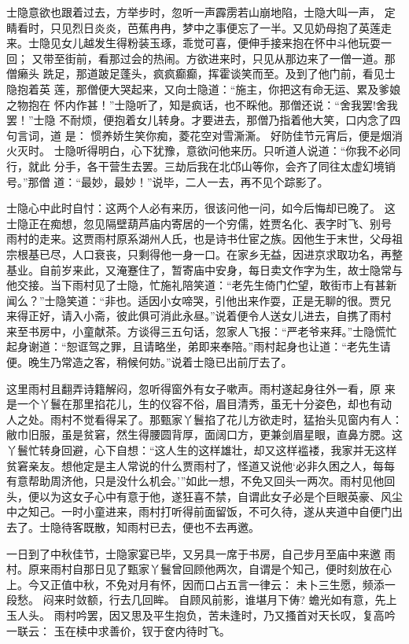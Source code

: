 士隐意欲也跟着过去，方举步时，忽听一声霹雳若山崩地陷，士隐大叫一声，
定睛看时，只见烈日炎炎，芭蕉冉冉，梦中之事便忘了一半。又见奶母抱了英莲走
来。士隐见女儿越发生得粉装玉琢，乖觉可喜，便伸手接来抱在怀中斗他玩耍一回；
又带至街前，看那过会的热闹。方欲进来时，只见从那边来了一僧一道。那僧癞头
跣足，那道跛足蓬头，疯疯癫癫，挥霍谈笑而至。及到了他门前，看见士隐抱着英
莲，那僧便大哭起来，又向士隐道：“施主，你把这有命无运、累及爹娘之物抱在
怀内作甚！”士隐听了，知是疯话，也不睬他。那僧还说：“舍我罢!舍我罢！”士隐
不耐烦，便抱着女儿转身。才要进去，那僧乃指着他大笑，口内念了四句言词，道
是：
惯养娇生笑你痴，菱花空对雪澌澌。
好防佳节元宵后，便是烟消火灭时。
士隐听得明白，心下犹豫，意欲问他来历。只听道人说道：“你我不必同行，就此
分手，各干营生去罢。三劫后我在北邙山等你，会齐了同往太虚幻境销号。”那僧
道：“最妙，最妙！”说毕，二人一去，再不见个踪影了。

士隐心中此时自忖：这两个人必有来历，很该问他一问，如今后悔却已晚了。
这士隐正在痴想，忽见隔壁葫芦庙内寄居的一个穷儒，姓贾名化、表字时飞、别号
雨村的走来。这贾雨村原系湖州人氏，也是诗书仕宦之族。因他生于末世，父母祖
宗根基已尽，人口衰丧，只剩得他一身一口。在家乡无益，因进京求取功名，再整
基业。自前岁来此，又淹蹇住了，暂寄庙中安身，每日卖文作字为生，故士隐常与
他交接。当下雨村见了士隐，忙施礼陪笑道：“老先生倚门伫望，敢街市上有甚新
闻么？”士隐笑道：“非也。适因小女啼哭，引他出来作耍，正是无聊的很。贾兄
来得正好，请入小斋，彼此俱可消此永昼。”说着便令人送女儿进去，自携了雨村
来至书房中，小童献茶。方谈得三五句话，忽家人飞报：“严老爷来拜。”士隐慌忙
起身谢道：“恕诓驾之罪，且请略坐，弟即来奉陪。”雨村起身也让道：“老先生请
便。晚生乃常造之客，稍候何妨。”说着士隐已出前厅去了。

这里雨村且翻弄诗籍解闷，忽听得窗外有女子嗽声。雨村遂起身往外一看，原
来是一个丫鬟在那里掐花儿，生的仪容不俗，眉目清秀，虽无十分姿色，却也有动
人之处。雨村不觉看得呆了。那甄家丫鬟掐了花儿方欲走时，猛抬头见窗内有人：
敝巾旧服，虽是贫窘，然生得腰圆背厚，面阔口方，更兼剑眉星眼，直鼻方腮。这
丫鬟忙转身回避，心下自想：“这人生的这样雄壮，却又这样褴褛，我家并无这样
贫窘亲友。想他定是主人常说的什么贾雨村了，怪道又说他‘必非久困之人，每每
有意帮助周济他，只是没什么机会。’”如此一想，不免又回头一两次。雨村见他回
头，便以为这女子心中有意于他，遂狂喜不禁，自谓此女子必是个巨眼英豪、风尘
中之知己。一时小童进来，雨村打听得前面留饭，不可久待，遂从夹道中自便门出
去了。士隐待客既散，知雨村已去，便也不去再邀。

一日到了中秋佳节，士隐家宴已毕，又另具一席于书房，自己步月至庙中来邀
雨村。原来雨村自那日见了甄家丫鬟曾回顾他两次，自谓是个知己，便时刻放在心
上。今又正值中秋，不免对月有怀，因而口占五言一律云：
未卜三生愿，频添一段愁。
闷来时敛额，行去几回眸。
自顾风前影，谁堪月下俦?
蟾光如有意，先上玉人头。
雨村吟罢，因又思及平生抱负，苦未逢时，乃又搔首对天长叹，复高吟一联云：
玉在椟中求善价，钗于奁内待时飞。

